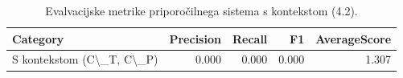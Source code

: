 \begin{table}[h]
\centering
\caption{Evalvacijske metrike priporočilnega sistema s kontekstom (4.2).}
\label{tab:evaluation_metrics_4_2}
\begin{tabular}{lrrrr}
\toprule
Category & Precision & Recall & F1 & AverageScore \\
\midrule
S kontekstom (C\textbackslash \_T, C\textbackslash \_P) & 0.000 & 0.000 & 0.000 & 1.307 \\
\bottomrule
\end{tabular}

\end{table}
